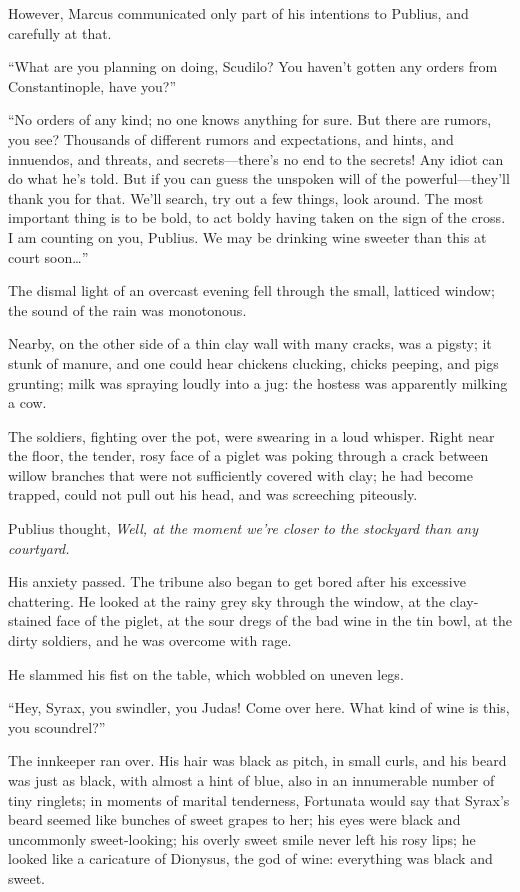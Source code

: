 However, Marcus communicated only part of his intentions to Publius, and carefully at that.

``What are you planning on doing, Scudilo? You haven't gotten any orders from Constantinople, have you?'' %

``No orders of any kind; no one knows anything for sure. But there are rumors, you see? Thousands of different rumors and expectations, and hints, and innuendos, and threats, and secrets---there's no end to the secrets! Any idiot can do what he's told. But if you can guess the unspoken will of the powerful---they'll thank you for that. We'll search, try out a few things, look around. The most important thing is to be bold, to act boldy having taken on the sign of the cross. I am counting on you, Publius. We may be drinking wine sweeter than this at court soon\ldots{}'' %

The dismal light of an overcast evening fell through the small, latticed window; the sound of the rain was monotonous.

Nearby, on the other side of a thin clay wall with many cracks, was a pigsty; it stunk of manure, and one could hear chickens clucking, chicks peeping, and pigs grunting; milk was spraying loudly into a jug: the hostess was apparently milking a cow.

The soldiers, fighting over the pot, were swearing in a loud whisper. Right near the floor, the tender, rosy face of a piglet was poking through a crack between willow branches that were not sufficiently covered with clay; he had become trapped, could not pull out his head, and was screeching piteously.

Publius thought, \textit{Well, at the moment we're closer to the stockyard than any courtyard.}

His anxiety passed. The tribune also began to get bored after his excessive chattering. He looked at the rainy grey sky through the window, at the clay-stained face of the piglet, at the sour dregs of the bad wine in the tin bowl, at the dirty soldiers, and he was overcome with rage.

He slammed his fist on the table, which wobbled on uneven legs.

``Hey, Syrax, you swindler, you Judas! Come over here. What kind of wine is this, you scoundrel?'' %

The innkeeper ran over. His hair was black as pitch, in small curls, and his beard was just as black, with almost a hint of blue, also in an innumerable number of tiny ringlets; in moments of marital tenderness, Fortunata would say that Syrax's beard seemed like bunches of sweet grapes to her; his eyes were black and uncommonly sweet-looking; his overly sweet smile never left his rosy lips; he looked like a caricature of Dionysus, the god of wine: everything was black and sweet.

